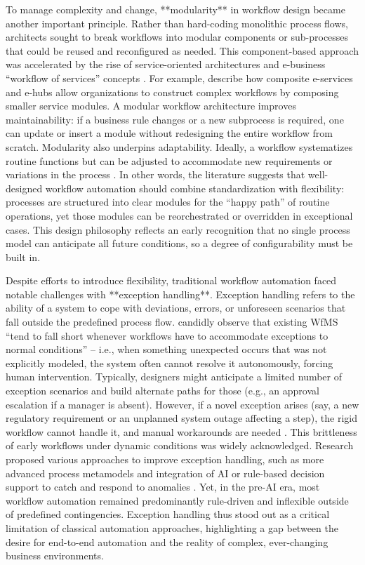 To manage complexity and change, **modularity** in workflow design became another important principle. Rather than hard-coding monolithic process flows, architects sought to break workflows into modular components or sub-processes that could be reused and reconfigured as needed. This component-based approach was accelerated by the rise of service-oriented architectures and e-business “workflow of services” concepts \citep{basuResearch2002}. For example, \textcite{basuResearch2002} describe how composite e-services and e-hubs allow organizations to construct complex workflows by composing smaller service modules. A modular workflow architecture improves maintainability: if a business rule changes or a new subprocess is required, one can update or insert a module without redesigning the entire workflow from scratch. Modularity also underpins adaptability. Ideally, a workflow systematizes routine functions but can be adjusted to accommodate new requirements or variations in the process \citep{basuResearch2002}. In other words, the literature suggests that well-designed workflow automation should combine standardization with flexibility: processes are structured into clear modules for the “happy path” of routine operations, yet those modules can be reorchestrated or overridden in exceptional cases. This design philosophy reflects an early recognition that no single process model can anticipate all future conditions, so a degree of configurability must be built in.

Despite efforts to introduce flexibility, traditional workflow automation faced notable challenges with **exception handling**. Exception handling refers to the ability of a system to cope with deviations, errors, or unforeseen scenarios that fall outside the predefined process flow. \textcite{basuResearch2002} candidly observe that existing WfMS “tend to fall short whenever workflows have to accommodate exceptions to normal conditions” – i.e., when something unexpected occurs that was not explicitly modeled, the system often cannot resolve it autonomously, forcing human intervention. Typically, designers might anticipate a limited number of exception scenarios and build alternate paths for those (e.g., an approval escalation if a manager is absent). However, if a novel exception arises (say, a new regulatory requirement or an unplanned system outage affecting a step), the rigid workflow cannot handle it, and manual workarounds are needed \citep{basuResearch2002}. This brittleness of early workflows under dynamic conditions was widely acknowledged. Research proposed various approaches to improve exception handling, such as more advanced process metamodels and integration of AI or rule-based decision support to catch and respond to anomalies \citep{basuResearch2002}. Yet, in the pre-AI era, most workflow automation remained predominantly rule-driven and inflexible outside of predefined contingencies. Exception handling thus stood out as a critical limitation of classical automation approaches, highlighting a gap between the desire for end-to-end automation and the reality of complex, ever-changing business environments.

